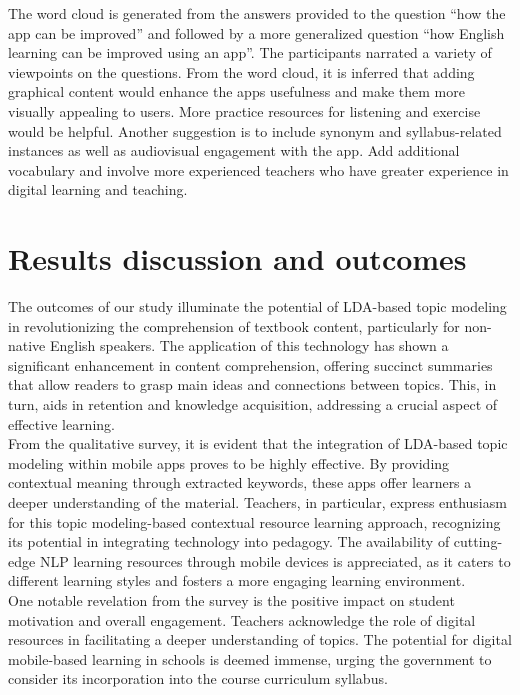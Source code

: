 \documentclass[sn-mathphys,Numbered]{sn-jnl}%
\theoremstyle{thmstyleone}%
\theoremstyle{thmstyletwo}%
\theoremstyle{thmstylethree}%
\begin{document}
The word cloud is generated from the answers provided to the question ``how the app can be improved'' and followed by a more generalized question ``how English learning can be improved using an app''. The participants narrated a variety of viewpoints on the questions. From the word cloud, it is inferred that adding graphical content would enhance the apps\textquotesingle{} usefulness and make them more visually appealing to users. More practice resources for listening and exercise would be helpful. Another suggestion is to include synonym and syllabus-related instances as well as audiovisual engagement with the app. Add additional vocabulary and involve more experienced teachers who have greater experience in digital learning and teaching.\\

\section{Results discussion and outcomes}\label{res_dis}

The outcomes of our study illuminate the potential of LDA-based topic modeling in revolutionizing the comprehension of textbook content, particularly for non-native English speakers. The application of this technology has shown a significant enhancement in content comprehension, offering succinct summaries that allow readers to grasp main ideas and connections between topics. This, in turn, aids in retention and knowledge acquisition, addressing a crucial aspect of effective learning.\\

From the qualitative survey, it is evident that the integration of LDA-based topic modeling within mobile apps proves to be highly effective. By providing contextual meaning through extracted keywords, these apps offer learners a deeper understanding of the material. Teachers, in particular, express enthusiasm for this topic modeling-based contextual resource learning approach, recognizing its potential in integrating technology into pedagogy. The availability of cutting-edge NLP learning resources through mobile devices is appreciated, as it caters to different learning styles and fosters a more engaging learning environment.\\

One notable revelation from the survey is the positive impact on student motivation and overall engagement. Teachers acknowledge the role of digital resources in facilitating a deeper understanding of topics. The potential for digital mobile-based learning in schools is deemed immense, urging the government to consider its incorporation into the course curriculum syllabus.\\
\end{document}
